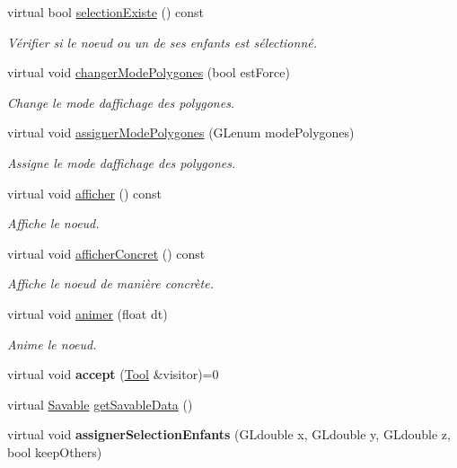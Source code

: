 \begin{DoxyCompactItemize}
virtual bool \hyperlink{group__inf2990_gae7c702b865babd20ddd30dd776adc82b}{selection\+Existe} () const 
\begin{DoxyCompactList}\small\item\em Vérifier si le noeud ou un de ses enfants est sélectionné. \end{DoxyCompactList}\item 
virtual void \hyperlink{group__inf2990_ga13a97383c2081b405fc2e0d97cff80df}{changer\+Mode\+Polygones} (bool est\+Force)
\begin{DoxyCompactList}\small\item\em Change le mode d\textquotesingle{}affichage des polygones. \end{DoxyCompactList}\item 
virtual void \hyperlink{group__inf2990_ga726d9d0a524939f405aeeac3fbd06666}{assigner\+Mode\+Polygones} (G\+Lenum mode\+Polygones)
\begin{DoxyCompactList}\small\item\em Assigne le mode d\textquotesingle{}affichage des polygones. \end{DoxyCompactList}\item 
virtual void \hyperlink{group__inf2990_gae789271ea41032d717b8e4300be05de0}{afficher} () const 
\begin{DoxyCompactList}\small\item\em Affiche le noeud. \end{DoxyCompactList}\item 
virtual void \hyperlink{group__inf2990_ga330df455c8b08440d3c8e64d0a480391}{afficher\+Concret} () const 
\begin{DoxyCompactList}\small\item\em Affiche le noeud de manière concrète. \end{DoxyCompactList}\item 
virtual void \hyperlink{group__inf2990_gadc6ebe69894dbb682fdd0ecb1b6c11e9}{animer} (float dt)
\begin{DoxyCompactList}\small\item\em Anime le noeud. \end{DoxyCompactList}\item 
\hypertarget{class_noeud_abstrait_ac166d3266931e3bb81d4df1617108340}{}virtual void {\bfseries accept} (\hyperlink{class_tool}{Tool} \&visitor)=0\label{class_noeud_abstrait_ac166d3266931e3bb81d4df1617108340}

\item 
virtual \hyperlink{class_savable}{Savable} \hyperlink{group__inf2990_ga1729231ec41b3ba4d6668eba101ead44}{get\+Savable\+Data} ()
\item 
\hypertarget{group__inf2990_ga78bba41d63a1a2a621e82c8247180b42}{}virtual void {\bfseries assigner\+Selection\+Enfants} (G\+Ldouble x, G\+Ldouble y, G\+Ldouble z, bool keep\+Others)\label{group__inf2990_ga78bba41d63a1a2a621e82c8247180b42}


\end{DoxyCompactItemize}
